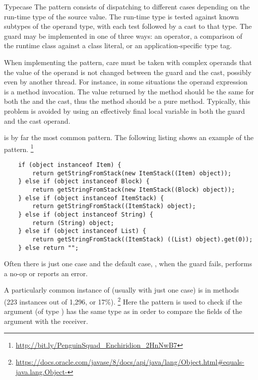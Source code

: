 \begin{pattern}{Typecase}
The \thisp{} pattern consists of dispatching to different cases
depending on the run-time type of the source value.
The run-time type is tested against known subtypes of the operand type,
with each test followed by a cast to that type.
The guard may be implemented in one of three ways: an  operator,
a comparison of the runtime class against a class literal,
or an application-specific type tag.

When implementing the pattern,
care must be taken with complex operands that the value of the operand is
not changed between the guard and the cast, possibly even by another thread.
For instance, in some situations the operand expression is a method invocation.
The value returned by the method should be the same for both the
 and the cast, thus the method should be a pure method.
Typically, this problem is avoided by using an effectively final local variable in both the guard and the
cast operand.

\instances{}
\thisp{} is by far the most common pattern.
The following listing shows an example of the \thisp{} pattern.%
\footnote{\url{http://bit.ly/PenguinSquad_Enchiridion_2HnNwB7}}

\begin{verbatim}
	if (object instanceof Item) {
		return getStringFromStack(new ItemStack((Item) object));
	} else if (object instanceof Block) {
		return getStringFromStack(new ItemStack((Block) object));
	} else if (object instanceof ItemStack) {
		return getStringFromStack((ItemStack) object);
	} else if (object instanceof String) {
		return (String) object;
	} else if (object instanceof List) {
		return getStringFromStack((ItemStack) ((List) object).get(0));
	} else return "";
\end{verbatim}

Often there is just one case and the default case, \ie, when the guard
fails, performs a no-op or reports an error.

A particularly common instance of \thisp{} (usually with just one case) is in  methods (223
instances out of 1,296, or 17\%).%
\footnote{\url{https://docs.oracle.com/javase/8/docs/api/java/lang/Object.html\#equals-java.lang.Object-}}
Here the pattern is used to check if the argument (of type ) has the same type as 
in order to compare the fields of the argument with the receiver.


\end{pattern}
